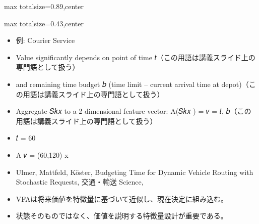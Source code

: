 \begin{minipage}[t]{0.58\textwidth}
\begin{adjustbox}{max totalsize={\textwidth}{0.89\textheight},center}
\begin{minipage}{\textwidth}
\end{minipage}
\end{adjustbox}
\end{minipage}


\clearpage
{}
\begin{minipage}[t]{0.405\textwidth}
\begin{adjustbox}{max totalsize={\textwidth}{0.43\textheight},center}
\begin{minipage}{\textwidth}\scriptsize
{}\begin{itemize}
\item 例: Courier Service
\item Value significantly depends on point of time 𝑡（この用語は講義スライド上の専門語として扱う）
\item and remaining time budget 𝑏 (time limit – current arrival time at depot)（この用語は講義スライド上の専門語として扱う）
\item Aggregate 𝑆𝑘𝑥 to a 2-dimensional feature vector: A(𝑆𝑘𝑥 ) = 𝑣 = 𝑡, 𝑏（この用語は講義スライド上の専門語として扱う）
\item 𝑡 = 60
\item A 𝑣 = (60,120) x
\item Ulmer, Mattfeld, Köster, Budgeting Time for Dynamic Vehicle Routing with Stochastic Requests, 交通・輸送 Science,
\end{itemize}\begin{itemize}
\item VFAは将来価値を特徴量に基づいて近似し、現在決定に組み込む。
\item 状態そのものではなく、価値を説明する特徴量設計が重要である。
\end{itemize}
\end{minipage}
\end{adjustbox}
\end{minipage}\hfill
